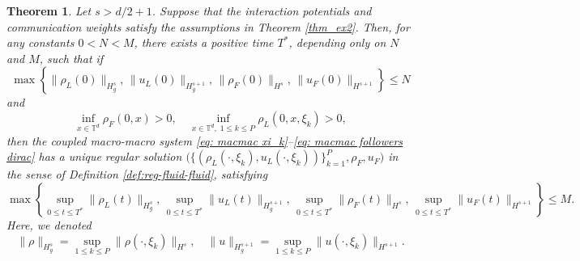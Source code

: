 \documentclass[10pt, reqno]{amsart}
\newtheorem{theorem}{Theorem}[section]
\theoremstyle{definition}
\theoremstyle{remark}
\numberwithin{equation}{section}
\newcommand{\calW}{\mathcal W}
\newcommand{\T}{\mathbb{T}}
\begin{document}
\begin{theorem}\label{thm:fluid-fluid}
Let $s > d/2 + 1$.  Suppose that the interaction potentials and communication weights satisfy the assumptions in Theorem \ref{thm_ex2}.
Then, for any constants $0 < N < M$, there exists a positive time $T^*$, depending only on $N$ and $M$, such that if
\[
\max\left\{  \|\rho_L(0)\|_{H^s_g}, \,   \|u_L(0)\|_{H^{s+1}_g}, \, \|\rho_F(0)\|_{H^s}, \,\|u_F(0)\|_{H^{s+1}}\right\} \leq N
\]
and
\[
\inf_{x \in \mathbb{T}^d} \rho_F(0,x) > 0, \quad \inf_{x \in \mathbb{T}^d,\; 1\le k \le P} \rho_L(0,x,\xi_k) > 0,
\]
then the coupled macro-macro system \eqref{eq: macmac xi_k}--\eqref{eq: macmac followers dirac} has a unique regular solution  $\big(\{(\rho_L(\cdot,\xi_k), u_L(\cdot,\xi_k))\}_{k=1}^P, \rho_F, u_F\big)$ in the sense of Definition \ref{def:reg-fluid-fluid}, satisfying
\begin{equation}\label{bd_ff}
\max\left\{\sup_{0\le t\le T^*} \|\rho_L(t)\|_{H^s_g}, \, \sup_{0\le t\le T^*} \|u_L(t)\|_{H^{s+1}_g}, \, \sup_{0\le t\le T^*} \|\rho_F(t)\|_{H^s}, \, \sup_{0\le t\le T^*} \|u_F(t)\|_{H^{s+1}} \right\} \leq M.
\end{equation}
Here, we denoted
\[
\|\rho\|_{H^s_g} = \sup_{1 \leq k \leq P} \|\rho(\cdot, \xi_k)\|_{H^s}, \quad \|u\|_{H^{s+1}_g} = \sup_{1 \leq k \leq P} \|u(\cdot, \xi_k)\|_{H^{s+1}}.
\]
\end{theorem}


  
%
%
%
%
%
\end{document}
